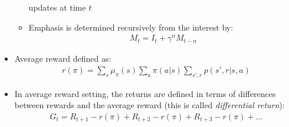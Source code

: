 \documentclass[12pt]{article}
\begin{document}
\begin{itemize}
\begin{itemize}
      updates at time $t$
      \item Emphasis is determined recursively from the interest by:
      \begin{gather*}
        M_t = I_t + \gamma^nM_{t-n}
      \end{gather*}
    \end{itemize}
    \item Average reward defined as:
    \begin{gather*}
      r(\pi) = \sum\limits_{s}\mu_\pi(s)\sum\limits_{a}\pi(a|s)\sum\limits_{s', r}p(s', r | s, a)
    \end{gather*}
    \item In average reward setting, the returns are defined in terms of differences between
    rewards and the average reward (this is called \textit{differential return}):
    \begin{gather*}
      G_t = R_{t+1} - r(\pi) + R_{t+2} - r(\pi) + R_{t+3} - r(\pi) + \dots
    \end{gather*}
  \end{itemize}
\end{document}
